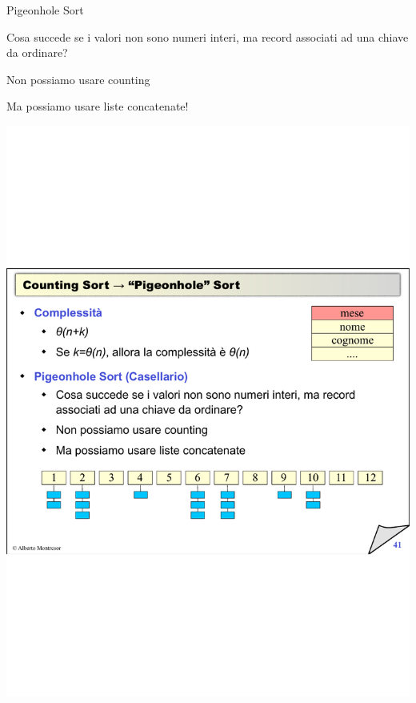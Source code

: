 \begin{frame}{Pigeonhole Sort}

\vspace{-9pt}
\begin{myboxtitle}[Casellario]
\BI
\item Cosa succede se i valori non sono numeri interi, ma record associati ad una chiave da ordinare?
\item Non possiamo usare counting
\item Ma possiamo usare liste concatenate!
\EI
\end{myboxtitle}

\bigskip
\includegraphics[width=\textwidth]{pigeonhole.pdf}	


\end{frame}%

